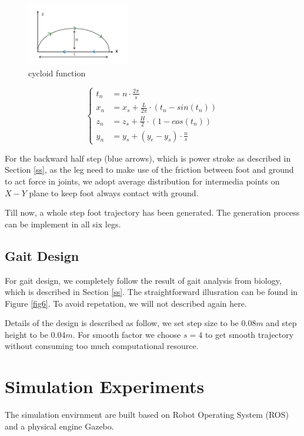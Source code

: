 \documentclass[conference]{IEEEtran}
\begin{document}
\begin{figure}
    \centerline{\includegraphics[width=0.4\textwidth]{traj.png}}
    \caption{cycloid function}
    \label{fig5}
\end{figure}

\begin{equation}
    \begin{cases}
    t_n &= n \cdot \frac{2\pi}{s}\\
    x_n &= x_s+\frac{L}{2\pi} \cdot(t_n- sin(t_n))\\
    z_n &= z_s+\frac{H}{2}\cdot(1- cos(t_n))\\
    y_n &= y_s + (y_e - y_s)\cdot \frac{n}{s}    
    \end{cases}
\end{equation}

For the backward half step (blue arrows), which is power stroke as described in Section \ref{ss}, as the leg need to make use of the friction between foot and ground to act force in joints, we adopt average distribution for intermedia points on \(X-Y\) plane to keep foot always contact with ground. 

Till now, a whole step foot trajectory has been generated. The generation process can be implement in all six legs.

\subsection{Gait Design}

For gait design, we completely follow the result of gait analysis from biology, which is described in Section \ref{ss}. The straightforward illusration can be found in Figure \ref{fig6}. To avoid repetation, we will not described again here.

Details of the design is described as follow, we set step size to be \(0.08m\) and step height to be \(0.04m\). For smooth factor we choose \(s=4\) to get smooth trajectory without consuming too much computational resource.

\section{Simulation Experiments}\label{s5}
The simulation envirnment are built based on Robot Operating System (ROS) and a physical engine Gazebo.
\end{document}
